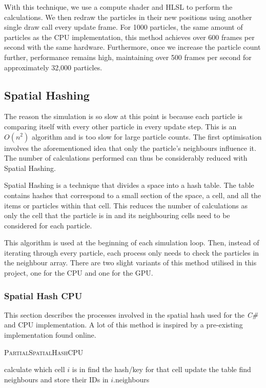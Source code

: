 \documentclass[a4paper, 12pt]{article}
\begin{document}
    With this technique, we use a compute shader and HLSL to perform the calculations. We then redraw the particles in their new positions using another single draw call every update frame. For 1000 particles, the same amount of particles as the CPU implementation, this method achieves over 600 frames per second with the same hardware. Furthermore, once we increase the particle count further, performance remains high, maintaining over 500 frames per second for approximately 32,000 particles.

    \subsection{Spatial Hashing}

    The reason the simulation is so slow at this point is because each particle is comparing itself with every other particle in every update step. This is an $O(n^2)$ algorithm and is too slow for large particle counts. The first optimisation involves the aforementioned idea that only the particle's neighbours influence it. The number of calculations performed can thus be considerably reduced with Spatial Hashing.

    Spatial Hashing is a technique that divides a space into a hash table. The table contains hashes that correspond to a small section of the space, a cell, and all the items or particles within that cell\cite{spatialpython}. This reduces the number of calculations as only the cell that the particle is in and its neighbouring cells need to be considered for each particle. 
    
    This algorithm is used at the beginning of each simulation loop. Then, instead of iterating through every particle, each process only needs to check the particles in the neighbour array. There are two slight variants of this method utilised in this project, one for the CPU and one for the GPU.

    \subsubsection{Spatial Hash CPU}

    This section describes the processes involved in the spatial hash used for the \textit{C\#} and CPU implementation. A lot of this method is inspired by a pre-existing implementation found online\cite{sphspatialexample}.

    \begin{algorithm}[H]
        \caption{\textsc{PartialSpatialHashCPU}}
    
        \begin{algorithmic}[1]
                \State calculate which cell $i$ is in
                \State find the hash/key for that cell
            \EndFor
                \State update the table
            \EndFor
                \State find neighbours and store their IDs in $i$.neighbours
            \EndFor
        \end{algorithmic}
    \end{algorithm}
\end{document}
